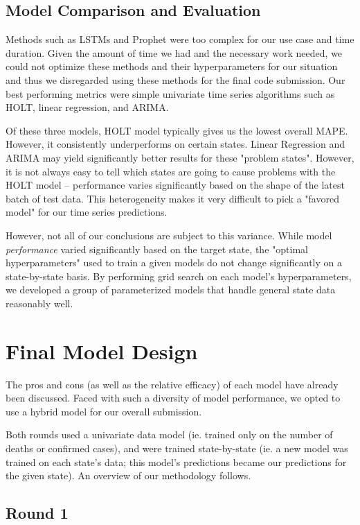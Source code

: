 \documentclass[sigconf,nonacm]{acmart}
\begin{document}
\subsection{Model Comparison and Evaluation}

Methods such as LSTMs and Prophet were too complex for our use case and time
duration. Given the amount of time we had and the necessary work needed, we
could not optimize these methods and their hyperparameters for our situation
and thus we disregarded using these methods for the final code submission.
Our best performing metrics were simple univariate time series algorithms such
as HOLT, linear regression, and ARIMA. 

Of these three models, HOLT model typically gives us the lowest overall MAPE.
However, it consistently underperforms on certain states. Linear Regression and
ARIMA may yield significantly better results for these "problem states".
However, it is not always easy to tell which states are going to cause problems
with the HOLT model -- performance varies significantly based on the shape of
the latest batch of test data. This heterogeneity makes it very difficult to
pick a "favored model" for our time series predictions. 

However, not all of our conclusions are subject to this variance. While model
\emph{performance} varied significantly based on the target state, the "optimal
hyperparameters" used to train a given models do not change significantly on a
state-by-state basis. By performing grid search on each model's
hyperparameters, we developed a group of parameterized models that handle
general state data reasonably well. 



\section{Final Model Design}

The pros and cons (as well as the relative efficacy) of each model have already
been discussed. Faced with such a diversity of model performance, we opted to
use a hybrid model for our overall submission. 

Both rounds used a univariate data model (ie. trained only on the number of
deaths or confirmed cases), and were trained state-by-state (ie. a new model
was trained on each state's data; this model's predictions became our
predictions for the given state). An overview of our methodology follows. 

\subsection{Round 1}
\end{document}
